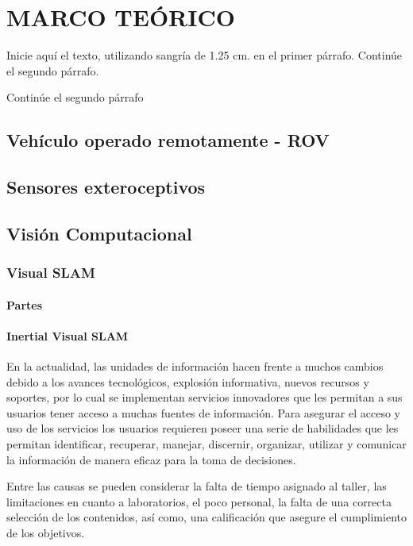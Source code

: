 \chapter{MARCO TEÓRICO}

Inicie aquí el texto, utilizando sangría de 1.25 cm. en el primer
párrafo. Continúe el segundo párrafo.

Continúe el segundo párrafo
\section{Vehículo operado remotamente - ROV}
\section{Sensores exteroceptivos}

\section{Visión Computacional}
\subsection{Visual SLAM}
\subsubsection{Partes }
\subsubsection{Inertial Visual SLAM}
En la actualidad, las unidades de información hacen frente a muchos cambios
debido a los avances tecnológicos, explosión informativa, nuevos recursos y
soportes, por lo cual se implementan servicios innovadores que les permitan a
sus usuarios tener acceso a muchas fuentes de información. Para asegurar el
acceso y uso de los servicios los usuarios requieren poseer una serie de
habilidades que les permitan identificar, recuperar, manejar, discernir,
organizar, utilizar y comunicar la información de manera eficaz para la toma de
decisiones.

Entre las causas se pueden considerar la falta de tiempo asignado al taller,
las limitaciones en cuanto a laboratorios, el poco personal, la falta de una
correcta selección de los contenidos, así como, una calificación que asegure el
cumplimiento de los objetivos.



